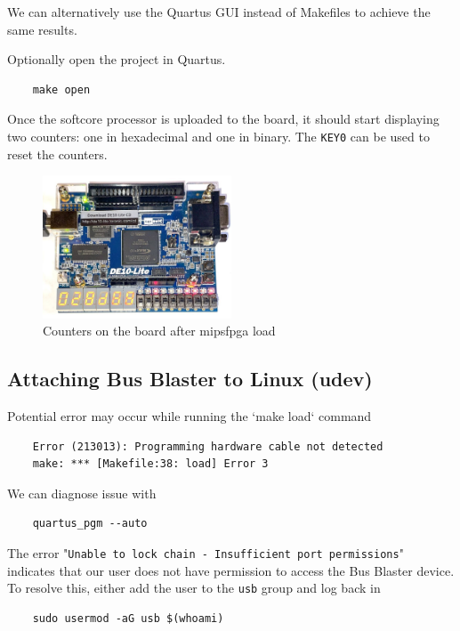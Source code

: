 \documentclass[a4paper]{article}
\let\oldtexttt\texttt
\renewcommand{\texttt}[1]{\textcolor{mygray}{\oldtexttt{#1}}}
\begin{document}
We can alternatively use the Quartus GUI instead of Makefiles to achieve the same results.

Optionally open the project in Quartus.

\begin{lstlisting}
    make open
\end{lstlisting}

Once the softcore processor is uploaded to the board, it should start
displaying two counters: one in hexadecimal and one in binary. The \texttt{KEY0} can be
used to reset the counters.

\begin{figure}[H]
    \centering
    \includegraphics[width=0.5\textwidth]{counter.jpg}
    \captionsetup{width=0.8\textwidth}
    \caption{Counters on the board after mipsfpga load}
\end{figure}

\subsection{Attaching Bus Blaster to Linux (udev)}

Potential error may occur while running the `make load` command

\begin{lstlisting}
    Error (213013): Programming hardware cable not detected
    make: *** [Makefile:38: load] Error 3
\end{lstlisting}

We can diagnose issue with
\begin{lstlisting}
    quartus_pgm --auto
\end{lstlisting}

The error "\texttt{Unable to lock chain - Insufficient port permissions}" indicates
that our user does not have permission to access the Bus Blaster device.
To resolve this, either add the user to the \texttt{usb} group and log back in

\begin{lstlisting}
    sudo usermod -aG usb $(whoami)
\end{lstlisting}
\end{document}
